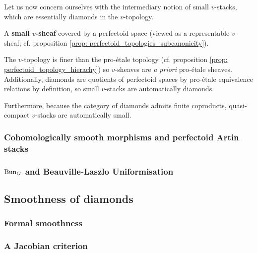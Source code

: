                 Let us now concern ourselves with the intermediary notion of small $v$-stacks, which are essentially diamonds in the $v$-topology.
                \begin{definition} \label{def: small_v_stacks} 
                    A \textbf{small $v$-sheaf} covered by a perfectoid space (viewed as a representable $v$-sheaf; cf. proposition \ref{prop: perfectoid_topologies_subcanonicity}).
                \end{definition}
                \begin{remark} \label{remark: dimaonds_are_small_v_sheaves}
                    The $v$-topology is finer than the pro-\'etale topology (cf. proposition \ref{prop: perfectoid_topology_hierachy}) so $v$-sheaves are \textit{a priori} pro-\'etale sheaves. Additionally, diamonds are quotients of perfectoid spaces by pro-\'etale equivalence relations by definition, so small $v$-stacks are automatically diamonds.  
                    
                    Furthermore, because the category of diamonds admits finite coproducts, quasi-compact $v$-stacks are automatically small.
                \end{remark}
            
            \subsubsection{Cohomologically smooth morphisms and perfectoid Artin stacks}
                \begin{definition} \label{def: perfectoid_artin_stacks} 
                    
                \end{definition}
                
            \subsubsection{\texorpdfstring{$\mathrm{Bun}_G$}{} and Beauville-Laszlo Uniformisation}
        
        \subsection{Smoothness of diamonds}
            \subsubsection{Formal smoothness}
            
            \subsubsection{A Jacobian criterion}